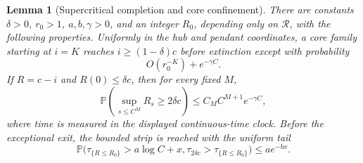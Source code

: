 \documentclass[11pt]{article}
\newtheorem{lemma}[theorem]{Lemma}
\theoremstyle{definition}
\theoremstyle{remark}
\newcommand{\Prob}{\mathbb P}
\begin{document}
\begin{lemma}[Supercritical completion and core confinement]
\label{lem:core-confinement}
There are constants $\delta>0$, $r_0>1$, $a,b,\gamma>0$, and an integer
$R_0$, depending only on $\mathcal R$, with the following properties.
Uniformly in the hub and pendant coordinates, a core family starting at
$i=K$ reaches $i\geq(1-\delta)c$ before extinction except with probability
\[
 O(r_0^{-K})+e^{-\gamma C}.
\]
If $R=c-i$ and $R(0)\leq\delta c$, then for every fixed $M$,
\begin{equation}
 \Prob\!\left(\sup_{s\leq C^M}R_s\geq2\delta c\right)
 \leq C_M C^{M+1}e^{-\gamma C},
\label{eq:core-confinement}
\end{equation}
where time is measured in the displayed continuous-time clock.  Before the
exceptional exit, the bounded strip is reached with the uniform tail
\begin{equation}
 \Prob\bigl(\tau_{\{R\leq R_0\}}>a\log C+x,
             \tau_{2\delta c}>\tau_{\{R\leq R_0\}}\bigr)
 \leq a e^{-bx}.
\label{eq:deficit-return}
\end{equation}
\end{lemma}
\end{document}

